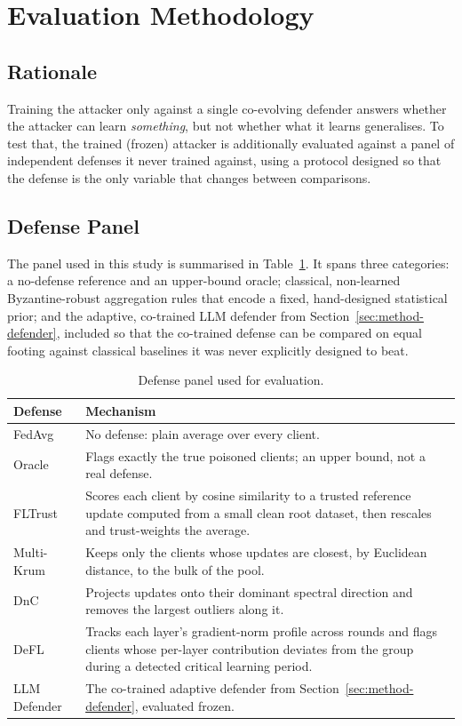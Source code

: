 \section{Evaluation Methodology}
\label{sec:method-eval}

\subsection{Rationale}
Training the attacker only against a single co-evolving defender answers whether the attacker can learn \emph{something}, but not whether what it learns generalises. To test that, the trained (frozen) attacker is additionally evaluated against a panel of independent defenses it never trained against, using a protocol designed so that the defense is the only variable that changes between comparisons.

\subsection{Defense Panel}
The panel used in this study is summarised in Table~\ref{tab:method-defenses}. It spans three categories: a no-defense reference and an upper-bound oracle; classical, non-learned Byzantine-robust aggregation rules that encode a fixed, hand-designed statistical prior; and the adaptive, co-trained LLM defender from Section~\ref{sec:method-defender}, included so that the co-trained defense can be compared on equal footing against classical baselines it was never explicitly designed to beat.

\begin{table}[h]
\centering
\caption{Defense panel used for evaluation.}
\label{tab:method-defenses}
\begin{tabular}{|l|p{7.5cm}|}
\hline
\textbf{Defense} & \textbf{Mechanism} \\
\hline
FedAvg & No defense: plain average over every client. \\
\hline
Oracle & Flags exactly the true poisoned clients; an upper bound, not a real defense. \\
\hline
FLTrust~\citep{fltrust} & Scores each client by cosine similarity to a trusted reference update computed from a small clean root dataset, then rescales and trust-weights the average. \\
\hline
Multi-Krum~\citep{krum} & Keeps only the clients whose updates are closest, by Euclidean distance, to the bulk of the pool. \\
\hline
DnC~\citep{dnc} & Projects updates onto their dominant spectral direction and removes the largest outliers along it. \\
\hline
DeFL~\citep{defl} & Tracks each layer's gradient-norm profile across rounds and flags clients whose per-layer contribution deviates from the group during a detected critical learning period. \\
\hline
LLM Defender & The co-trained adaptive defender from Section~\ref{sec:method-defender}, evaluated frozen. \\
\hline
\end{tabular}
\end{table}

